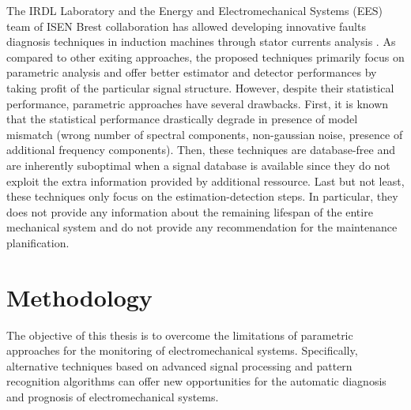 \documentclass{article}
\begin{document}
The IRDL Laboratory and the Energy and Electromechanical Systems (EES) team of ISEN Brest collaboration has allowed developing innovative faults diagnosis techniques in induction machines through stator currents analysis \cite{CHO12,TRA16,TRA17,ELB16}. As compared to other exiting approaches, the proposed techniques primarily focus on parametric analysis and offer better estimator and detector performances by taking profit of the particular signal structure. However, despite their statistical performance, parametric approaches have several drawbacks. First, it is known that the statistical performance drastically degrade in presence of model mismatch (wrong number of spectral components, non-gaussian noise, presence of additional frequency components). Then, these techniques are database-free and are inherently suboptimal when a signal database is available since they do not exploit the extra information provided by additional ressource.
Last but not least, these techniques only focus on the estimation-detection steps. In particular, they does not provide any information about the remaining lifespan of the entire mechanical system and do not provide any recommendation for the maintenance planification.

\section{Methodology}
The objective of this thesis is to overcome the limitations of parametric approaches for the monitoring of electromechanical systems. Specifically, alternative techniques based on advanced signal processing and pattern recognition algorithms can offer new opportunities for the automatic diagnosis and prognosis of electromechanical systems.
\end{document}
